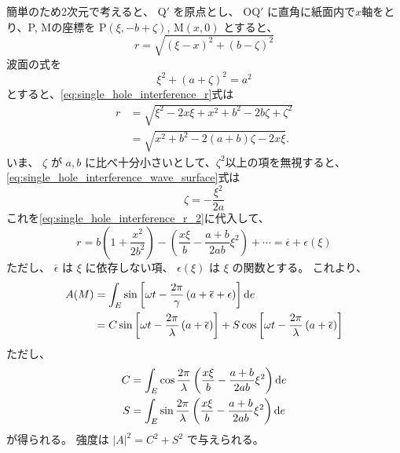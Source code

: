 \documentclass[../../../main]{subfiles}
\begin{document}
簡単のため2次元で考えると、 \( \mathrm{Q'} \) を原点とし、 \( \mathrm{OQ'} \) に直角に紙面内で\( x \)軸をとり、P, Mの座標を \( \mathrm{P}(\xi, -b + \zeta) \), \( \mathrm{M}(x, 0) \) とすると、
\begin{equation}\label{eq:single_hole_interference_r}
	r = \sqrt{\left( \xi - x \right)^2 + \left( b - \zeta \right)^2 }
\end{equation}
波面の式を
\begin{equation}\label{eq:single_hole_interference_wave_surface}
	\xi^2 + \left( a + \zeta \right)^2 = a^2
\end{equation}
とすると、\ref{eq:single_hole_interference_r}式は
\begin{align}\label{eq:single_hole_interference_r_2}
	r & = \sqrt{\xi^2 - 2x\xi+x^2 + b^2 - 2b\zeta + \zeta^2} \nonumber \\
	  & = \sqrt{x^2 + b^2 - 2 \left( a + b \right) \zeta - 2x \xi}.
\end{align}
いま、 \( \zeta \) が \( a,b \) に比べ十分小さいとして、\( \zeta^2 \)以上の項を無視すると、
\ref{eq:single_hole_interference_wave_surface}式は
\begin{equation}
	\zeta = - \dfrac{\xi^2}{2a}
\end{equation}
これを\ref{eq:single_hole_interference_r_2}に代入して、
\begin{equation}\label{eq:sigle_hole_interference_r_taylor}
	r = b \left( 1 + \dfrac{x^2}{2b^2}  \right) - \left( \dfrac{x \xi}{b} - \dfrac{a+b}{2ab}\xi^2   \right) + \cdots = \overline{\epsilon} + \epsilon(\xi)
\end{equation}
ただし、 \( \overline{\epsilon} \) は \( \xi \) に依存しない項、 \( \epsilon(\xi) \) は \( \xi \) の関数とする。
これより、
\begin{align}\label{eq:single_hole_interference_amplitude}
	A(M) & = \int_E \sin \left[ \omega t - \dfrac{2\pi}{\gamma} \left( a + \overline{\epsilon} + \epsilon \right)  \right] \odif{e} \nonumber                                                               \\
	     & = C \sin \left[ \omega t - \dfrac{2\pi}{\lambda} \left( a + \overline{\epsilon} \right)  \right] + S \cos \left[ \omega t - \dfrac{2\pi}{\lambda} \left( a + \overline{\epsilon} \right) \right]
\end{align}
ただし、
\begin{equation}
	\begin{aligned}
		C & = \int_E \cos \dfrac{2\pi}{\lambda} \left( \dfrac{x \xi}{b} - \dfrac{a+b}{2ab} \xi^2   \right) \odif{e} \\
		S & = \int_E \sin \dfrac{2\pi}{\lambda} \left( \dfrac{x \xi}{b} - \dfrac{a+b}{2ab} \xi^2   \right) \odif{e}
	\end{aligned}
\end{equation}
が得られる。
強度は \( |A|^2 = C^2 + S^2 \) で与えられる。
\end{document}
